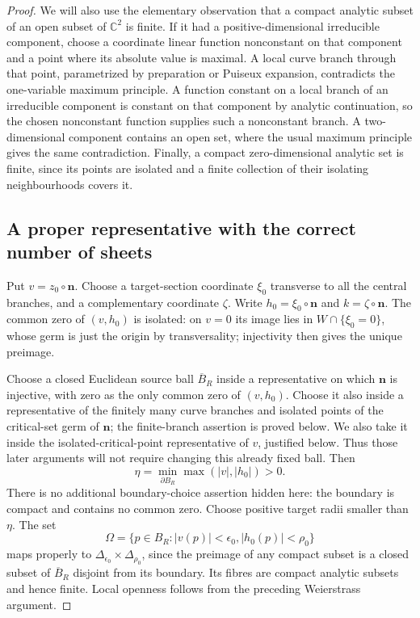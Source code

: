 \documentclass[11pt,a4paper]{article}
\theoremstyle{remark}
\begin{document}
\begin{proof}
We will also use the elementary observation that a compact analytic
subset of an open subset of $\mathbb C^2$ is finite.  If it had a
positive-dimensional irreducible component, choose a coordinate linear
function nonconstant on that component and a point where its absolute
value is maximal.  A local curve branch through that point, parametrized
by preparation or Puiseux expansion, contradicts the one-variable
maximum principle.  A function constant on a local branch of an
irreducible component is constant on that component by analytic
continuation, so the chosen nonconstant function supplies such a
nonconstant branch.  A two-dimensional component contains an open set,
where the usual maximum principle gives the same contradiction.  Finally,
a compact zero-dimensional analytic set is finite, since its points
are isolated and a finite collection of their isolating neighbourhoods
covers it.

\subsection{A proper representative with the correct number of sheets}

Put $v=z_0\circ\boldsymbol n$.  Choose a target-section coordinate
$\xi_0$ transverse to all the central branches, and a complementary
coordinate $\zeta$.  Write $h_0=\xi_0\circ\boldsymbol n$ and
$k=\zeta\circ\boldsymbol n$.  The common zero of $(v,h_0)$ is isolated:
on $v=0$ its image lies in $W\cap\{\xi_0=0\}$, whose germ is just the
origin by transversality; injectivity then gives the unique preimage.

Choose a closed Euclidean source ball $\overline B_R$ inside a
representative on which $\boldsymbol n$ is injective, with zero as the
only common zero of $(v,h_0)$.  Choose it also inside a representative
of the finitely many curve branches and isolated points of the
critical-set germ of $\boldsymbol n$; the finite-branch assertion is
proved below.  We also take it inside the isolated-critical-point
representative of $v$, justified below.  Thus those
later arguments will not require changing
this already fixed ball.  Then
\[
 \eta=\min_{\partial B_R}\max(|v|,|h_0|)>0.
\]
There is no additional boundary-choice assertion hidden here: the
boundary is compact and contains no common zero.  Choose positive
target radii smaller than $\eta$.  The set
\[
 \Omega=\{p\in B_R:|v(p)|<\epsilon_0, |h_0(p)|<\rho_0\}
\]
maps properly to $\Delta_{\epsilon_0}\times\Delta_{\rho_0}$, since the
preimage of any compact subset is a closed subset of $\overline B_R$
disjoint from its boundary.  Its fibres are compact analytic subsets
and hence finite.  Local openness follows from the preceding
Weierstrass argument.


\end{proof}
\end{document}
